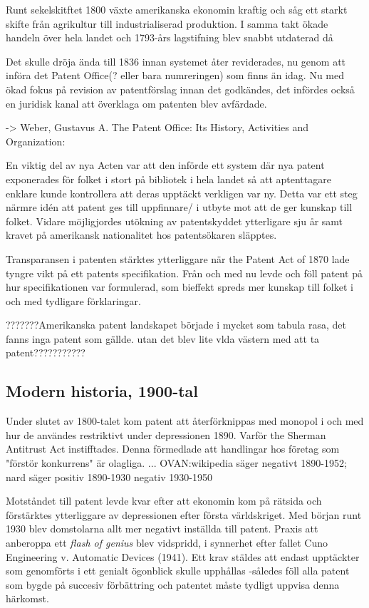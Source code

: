Runt sekelskitftet 1800 växte amerikanska ekonomin kraftig och såg ett starkt skifte från agrikultur till
industrialiserad produktion. I samma takt ökade handeln över hela landet och 1793-års lagstifning blev
snabbt utdaterad då

 Det skulle dröja ända till 1836 innan systemet åter reviderades, nu genom att införa det Patent Office(?
eller bara numreringen) som finns än idag. Nu med ökad fokus på revision av patentförslag innan det
godkändes, det infördes också en juridisk kanal att överklaga om patenten blev avfärdade.

-> Weber, Gustavus A. The Patent Office: Its History, Activities and Organization:

En viktig del av nya Acten var att den införde ett system där nya patent exponerades för folket i stort på
bibliotek i hela landet så att aptenttagare enklare kunde kontrollera att deras upptäckt verkligen var ny.
Detta var ett steg närmre idén att patent ges till uppfinnare/ i utbyte mot att de ger kunskap till folket.
Vidare möjligjordes utökning av patentskyddet ytterligare sju år samt kravet på amerikansk nationalitet hos
patentsökaren släpptes.

Transparansen i patenten stärktes ytterliggare när the Patent Act of 1870 lade tyngre vikt på ett patents
specifikation. Från och med nu levde och föll patent på hur specifikationen var formulerad, som bieffekt
spreds mer kunskap till folket i och med tydligare förklaringar.

???????Amerikanska patent landskapet började i mycket som tabula rasa, det fanns inga patent som gällde.
utan det blev lite vlda västern med att ta patent???????????


\subsection{Modern historia, 1900-tal} %

Under slutet av 1800-talet kom patent att återförknippas med monopol i och med hur de användes restriktivt
under depressionen 1890. Varför the Sherman Antitrust Act instifftades. Denna förmedlade att handlingar hos
företag som "förstör konkurrens" är olagliga. ... OVAN:wikipedia säger negativt 1890-1952; nard säger
positiv 1890-1930 negativ 1930-1950

Motståndet till patent levde kvar efter att ekonomin kom på rätsida och förstärktes ytterliggare av
depressionen efter första världskriget. Med början runt 1930 blev domstolarna allt mer negativt inställda
till patent. Praxis att anberoppa ett \emph{flash of genius} blev vidspridd, i synnerhet efter fallet Cuno
Engineering v. Automatic Devices (1941). Ett krav stäldes att endast upptäckter som genomförts i ett
genialt ögonblick skulle upphållas -således föll alla patent som bygde på succesiv förbättring och patentet
måste tydligt uppvisa denna härkomst.

